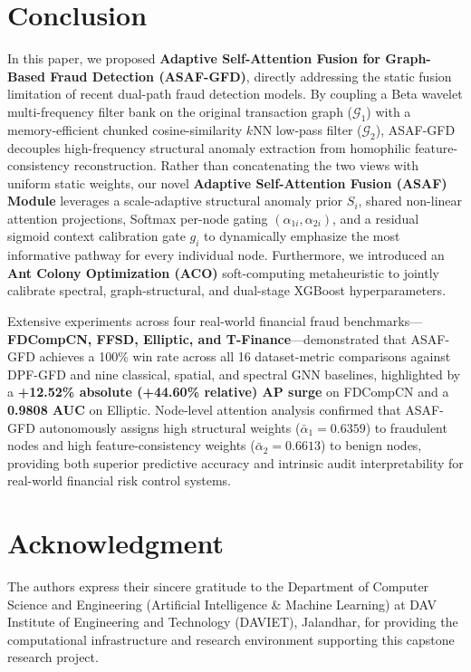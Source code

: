 \documentclass[10pt,a4paper,twocolumn]{article}
\begin{document}
\section{Conclusion}

In this paper, we proposed \textbf{Adaptive Self-Attention Fusion for Graph-Based Fraud Detection (ASAF-GFD)}, directly addressing the static fusion limitation of recent dual-path fraud detection models. By coupling a Beta wavelet multi-frequency filter bank on the original transaction graph ($\mathscr{G}_1$) with a memory-efficient chunked cosine-similarity $k$NN low-pass filter ($\mathscr{G}_2$), ASAF-GFD decouples high-frequency structural anomaly extraction from homophilic feature-consistency reconstruction. Rather than concatenating the two views with uniform static weights, our novel \textbf{Adaptive Self-Attention Fusion (ASAF) Module} leverages a scale-adaptive structural anomaly prior $S_i$, shared non-linear attention projections, Softmax per-node gating $(\alpha_{1i}, \alpha_{2i})$, and a residual sigmoid context calibration gate $g_i$ to dynamically emphasize the most informative pathway for every individual node. Furthermore, we introduced an \textbf{Ant Colony Optimization (ACO)} soft-computing metaheuristic to jointly calibrate spectral, graph-structural, and dual-stage XGBoost hyperparameters.

Extensive experiments across four real-world financial fraud benchmarks---\textbf{FDCompCN, FFSD, Elliptic, and T-Finance}---demonstrated that ASAF-GFD achieves a 100\% win rate across all 16 dataset-metric comparisons against DPF-GFD and nine classical, spatial, and spectral GNN baselines, highlighted by a \textbf{+12.52\% absolute (+44.60\% relative) AP surge} on FDCompCN and a \textbf{0.9808 AUC} on Elliptic. Node-level attention analysis confirmed that ASAF-GFD autonomously assigns high structural weights ($\bar{\alpha}_1 = 0.6359$) to fraudulent nodes and high feature-consistency weights ($\bar{\alpha}_2 = 0.6613$) to benign nodes, providing both superior predictive accuracy and intrinsic audit interpretability for real-world financial risk control systems.

\section*{Acknowledgment}

The authors express their sincere gratitude to the Department of Computer Science and Engineering (Artificial Intelligence \& Machine Learning) at DAV Institute of Engineering and Technology (DAVIET), Jalandhar, for providing the computational infrastructure and research environment supporting this capstone research project.
\end{document}
